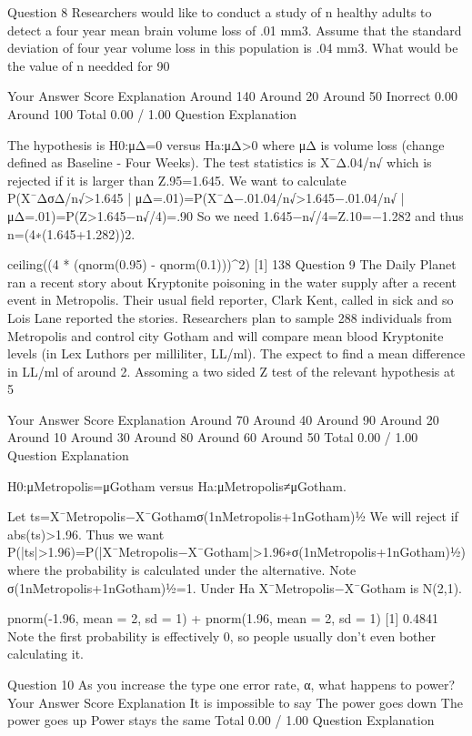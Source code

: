 Question 8
Researchers would like to conduct a study of n healthy adults to detect a four year mean brain volume loss of .01 mm3. Assume that the standard deviation of four year volume loss in this population is .04 mm3. What would be the value of n needded for 90%

Your Answer		Score	Explanation
Around 140			
Around 20			
Around 50	Inorrect	0.00	
Around 100			
Total		0.00 / 1.00	
Question Explanation

The hypothesis is H0:μΔ=0 versus Ha:μΔ>0 where μΔ is volume loss (change defined as Baseline - Four Weeks). The test statistics is X¯Δ.04/n√ which is rejected if it is larger than Z.95=1.645.
We want to calculate
P(X¯ΔσΔ/n√>1.645 | μΔ=.01)=P(X¯Δ−.01.04/n√>1.645−.01.04/n√ | μΔ=.01)=P(Z>1.645−n√/4)=.90
So we need 1.645−n√/4=Z.10=−1.282 and thus n=(4∗(1.645+1.282))2.

ceiling((4 * (qnorm(0.95) - qnorm(0.1)))^2)
[1] 138
Question 9
The Daily Planet ran a recent story about Kryptonite poisoning in the water supply after a recent event in Metropolis. Their usual field reporter, Clark Kent, called in sick and so Lois Lane reported the stories. Researchers plan to sample 288 individuals from Metropolis and control city Gotham and will compare mean blood Kryptonite levels (in Lex Luthors per milliliter, LL/ml). The expect to find a mean difference in LL/ml of around 2. Assoming a two sided Z test of the relevant hypothesis at 5%

Your Answer		Score	Explanation
Around 70%
Around 40%
Around 90%
Around 20%
Around 10%
Around 30%
Around 80%
Around 60%
Around 50%
Total		0.00 / 1.00	
Question Explanation

H0:μMetropolis=μGotham versus Ha:μMetropolis≠μGotham.

Let
ts=X¯Metropolis−X¯Gothamσ(1nMetropolis+1nGotham)½
We will reject if abs(ts)>1.96. Thus we want
P(|ts|>1.96)=P(|X¯Metropolis−X¯Gotham|>1.96∗σ(1nMetropolis+1nGotham)½)
where the probability is calculated under the alternative. Note σ(1nMetropolis+1nGotham)½=1. Under Ha X¯Metropolis−X¯Gotham is N(2,1).

pnorm(-1.96, mean = 2, sd = 1) + pnorm(1.96, mean = 2, sd = 1)
[1] 0.4841
Note the first probability is effectively 0, so people usually don't even bother calculating it.

Question 10
As you increase the type one error rate, α, what happens to power?
Your Answer		Score	Explanation
It is impossible to say			
The power goes down			
The power goes up			
Power stays the same			
Total		0.00 / 1.00	
Question Explanation


